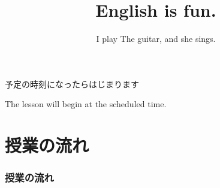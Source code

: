 \documentclass[aspectratio=169,xcolor={dvipsnames,table}]{beamer}
\title{English is fun.}
\subtitle{I play The guitar, and she sings.}
\author{}
\institute[]{}
\date[]
\begin{document}
\begin{frame}[label=waiting]{}
\thispagestyle{empty}
\Large
\raggedright

予定の時刻になったらはじまります

\vfill

\raggedleft

The lesson will begin at the scheduled time.
\end{frame}
\begin{frame}[plain]
  \titlepage
\end{frame}

\section*{授業の流れ}
\begin{frame}[plain]
  \frametitle{授業の流れ}
  \tableofcontents
\end{frame}
\end{document}
